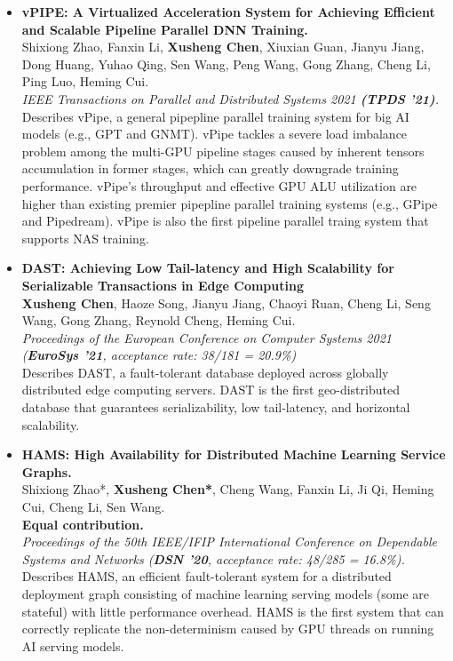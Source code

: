 \documentclass[a4paper,7pt]{article} %
\newcommand{\authors}[1]{{\small \fontfamily{cmss}\selectfont #1}}
\newcommand{\conference}[1]{\textit{\small \fontfamily{cmss}\selectfont #1}}
\newcommand{\info}[1]{{\footnotesize \fontfamily{cmss}\selectfont #1}}
\begin{document}
\begin{itemize}
    \item \textbf{vPIPE: A Virtualized Acceleration System for Achieving Efficient and Scalable Pipeline Parallel DNN Training.} \\
    \authors{Shixiong Zhao, Fanxin Li, \textbf{Xusheng Chen}, Xiuxian Guan, Jianyu Jiang, Dong Huang, Yuhao Qing, Sen Wang, Peng Wang, Gong Zhang, Cheng Li, Ping Luo, Heming Cui.} \\
    \conference{IEEE Transactions on Parallel and Distributed Systems 2021 \textbf{(TPDS '21)}.}  \\
    \info{Describes vPipe, a general pipepline parallel training system for big AI models (e.g., GPT and GNMT). vPipe tackles a severe load imbalance problem among the multi-GPU pipeline stages caused by inherent tensors accumulation in former stages, which can greatly downgrade training performance. vPipe's throughput and effective GPU ALU utilization are higher than existing premier pipepline parallel training systems (e.g., GPipe and Pipedream). vPipe is also the first pipeline parallel traing system that supports NAS training.}\\


    \item \textbf{DAST: Achieving Low Tail-latency and High Scalability for Serializable Transactions in Edge Computing} \\
    \authors{\textbf{Xusheng Chen}, Haoze Song, Jianyu Jiang, Chaoyi Ruan, Cheng Li, Seng Wang, Gong Zhang, Reynold Cheng, Heming Cui.} \\
    \conference{Proceedings of the European Conference on Computer Systems 2021 (\textbf{EuroSys '21}, acceptance rate: 38/181 = 20.9\%)} \\
    \info{Describes DAST, a fault-tolerant database deployed across
     globally distributed edge computing servers. DAST is the first
     geo-distributed database that guarantees serializability, low
     tail-latency, and horizontal scalability.} \\


    \item \textbf{HAMS: High Availability for Distributed Machine Learning Service Graphs.} \\ 
    \authors{Shixiong Zhao*, \textbf{Xusheng Chen*}, Cheng Wang, Fanxin Li, Ji Qi, Heming Cui, Cheng Li, Sen Wang.}\\
    \authors{\bf *Equal contribution.}\\
    \conference{Proceedings of the 50th IEEE/IFIP International Conference on Dependable Systems and Networks (\textbf{DSN '20}, acceptance rate: 48/285 = 16.8\%).}\\
    \info{Describes HAMS, an efficient fault-tolerant system for a distributed
    deployment graph consisting of machine learning serving models (some are
    stateful) with little performance overhead. HAMS is the first system that
    can correctly replicate the non-determinism caused by GPU threads on running
    AI serving models.} \\
  


\end{itemize}
\end{document}

